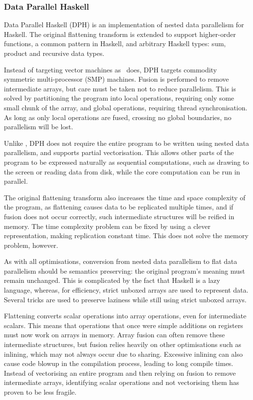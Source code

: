 \subsubsection{Data Parallel Haskell}
Data Parallel Haskell (DPH) is an implementation of nested data parallelism for Haskell\cite{chakravarty2007data}.
The original flattening transform is extended to support higher-order functions\cite{leshchinskiy2006higher}, a common pattern in Haskell,
and arbitrary Haskell types: sum, product and recursive data types\cite{chakravarty2000more}.

Instead of targeting vector machines as \nesl~does, DPH targets commodity symmetric multi-processor (SMP) machines.
Fusion is performed to remove intermediate arrays, but care must be taken not to reduce parallelism\cite{chakravarty1999portable}.
This is solved by partitioning the program into local operations, requiring only some small chunk of the array,
and global operations, requiring thread synchronisation\cite{keller1999distributed}.
As long as only local operations are fused, crossing no global boundaries, no parallelism will be lost.

Unlike \nesl, DPH does not require the entire program to be written using nested data parallelism,
and supports partial vectorisation\cite{chakravarty2008partial}.
This allows other parts of the program to be expressed naturally as sequential computations, such as drawing to the screen or reading data from disk,
while the core computation can be run in parallel.

The original flattening transform also increases the time and space complexity of the program,
as flattening causes data to be replicated multiple times,
and if fusion does not occur correctly, such intermediate structures will be reified in memory.
The time complexity problem can be fixed by using a clever representation, making replication constant time\cite{lippmeier2012work}.
This does not solve the memory problem, however.

As with all optimisations, conversion from nested data parallelism to flat data parallelism should be semantics preserving:
the original program's meaning must remain unchanged\cite{leshchinskiy2005higher}.
This is complicated by the fact that Haskell is a lazy language, whereas, for efficiency, strict unboxed arrays are used to represent data.
Several tricks are used to preserve laziness while still using strict unboxed arrays.

Flattening converts scalar operations into array operations, even for intermediate scalars\cite{keller2012vectorisation}.
This means that operations that once were simple additions on registers must now work on arrays in memory.
Array fusion can often remove these intermediate structures, but fusion relies heavily on other optimisations such as inlining,
which may not always occur due to sharing. Excessive inlining can also cause code blowup in the compilation process,
leading to long compile times.
Instead of vectorising an entire program and then relying on fusion to remove intermediate arrays,
identifying scalar operations and not vectorising them has proven to be less fragile.





